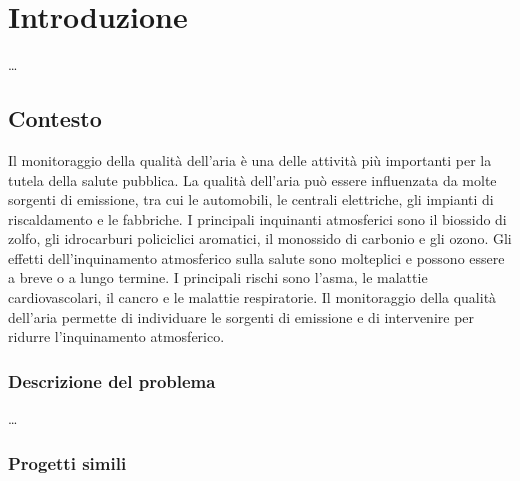 \chapter{Introduzione}\label{ch:introduzione}
\ldots

\section{Contesto}\label{sec:contesto}
Il monitoraggio della qualità dell'aria è una delle attività più importanti per la tutela della salute pubblica. La qualità dell'aria può essere influenzata da molte sorgenti di emissione, tra cui le automobili, le centrali elettriche, gli impianti di riscaldamento e le fabbriche. I principali inquinanti atmosferici sono il biossido di zolfo, gli idrocarburi policiclici aromatici, il monossido di carbonio e gli ozono. Gli effetti dell'inquinamento atmosferico sulla salute sono molteplici e possono essere a breve o a lungo termine. I principali rischi sono l'asma, le malattie cardiovascolari, il cancro e le malattie respiratorie. Il monitoraggio della qualità dell'aria permette di individuare le sorgenti di emissione e di intervenire per ridurre l'inquinamento atmosferico.

\subsection{Descrizione del problema}\label{ssec:problema}
\ldots

\subsection{Progetti simili}\label{ssec:competitor}

